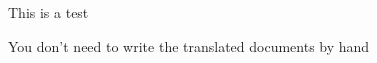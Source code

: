 \documentclass[a4paper]{article}
\begin{document}
This is a test

You don't need to write the translated documents by hand
\end{document}
